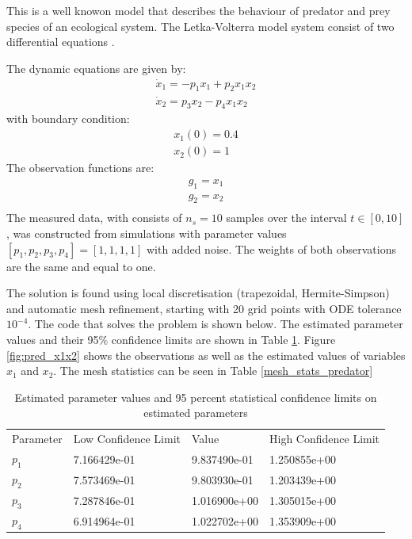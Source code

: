 \documentclass[a4paper,11pt]{report}    %
\newenvironment{shadedframe}{%
  \def\FrameCommand{\fcolorbox{black}{shadecolor}}%
  \MakeFramed {\FrameRestore}}
{\endMakeFramed}
\begin{document}
This is a well knowon model that describes the behaviour of predator and prey species of an ecological system. The Letka-Volterra model system consist of two differential equations \cite{Schittkowski:02}.

The dynamic equations are given by:
\begin{equation}
\begin{aligned}
  \dot{x}_1 = -p_1 x_1 + p_2 x_1 x_2 \\
  \dot{x}_2 = p_3 x_2 - p_4 x_1 x_2
\end{aligned}
\end{equation}
with boundary condition:
\[
\begin{aligned}
   x_1(0) = 0.4 \\
   x_2(0) = 1
\end{aligned}
\]
The observation functions are:
\begin{equation}
\begin{aligned}
  g_1 = x_1 \\
  g_2 = x_2 \\
\end{aligned}
\end{equation}
The measured data, with consists of $n_s=10$ samples over the interval $t \in [0,10]$, was constructed from simulations with parameter values $[p_1, p_2, p_3, p_4]=[1, 1, 1, 1]$ with added noise.  The weights of both observations are the same and equal to one. 

The solution is found using local discretisation (trapezoidal, Hermite-Simpson) and automatic mesh refinement, starting with 20 grid points with ODE tolerance $10^{-4}$. The code that solves the problem is shown below. The estimated parameter values and their 95$\%$ confidence limits are shown in Table \ref{pred-tab1}. Figure \ref{fig:pred_x1x2} shows the observations as well as the estimated values of variables $x_1$ and $x_2$. The mesh statistics can be seen in Table \ref{mesh_stats_predator}

\tiny
\begin{shadedframe}

\end{shadedframe}
\normalsize

\begin{table}
\label{pred-tab1}
\caption{Estimated parameter values and 95 percent statistical confidence limits on estimated parameters} 
\begin{tabular}{llll}
\hline
Parameter &	Low Confidence Limit &	Value 	&	High Confidence Limit\\
$p_1$	&	7.166429e-01	&	9.837490e-01	&	1.250855e+00\\
$p_2$	&	7.573469e-01	&	9.803930e-01	&	1.203439e+00\\
$p_3$	&	7.287846e-01	&	1.016900e+00	&	1.305015e+00\\
$p_4$	&	6.914964e-01	&	1.022702e+00	&	1.353909e+00\\
\hline
\end{tabular}
\end{table}
\end{document}
